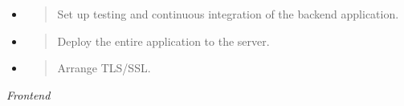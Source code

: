 \begin{itemize}
  \begin{itemize}
  \item
    \begin{quote}
    Set up testing and continuous integration of the backend
    application.
    \end{quote}
  \item
    \begin{quote}
    Deploy the entire application to the server.
    \end{quote}
  \item
    \begin{quote}
    Arrange TLS/SSL.
    \end{quote}
  \end{itemize}
\end{itemize}

\emph{Frontend}

